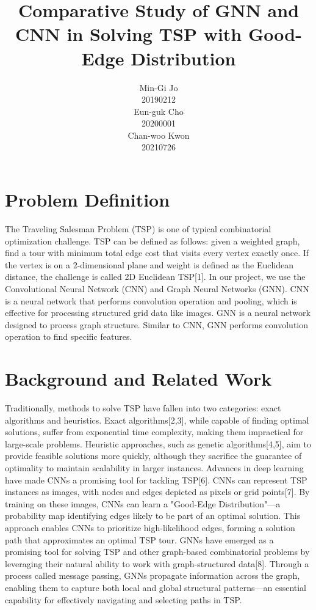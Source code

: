 \documentclass{article}
\title{Comparative Study of GNN and CNN in Solving TSP with Good-Edge Distribution}
\author{%
Min-Gi Jo \\
20190212\\
\And
Eun-guk Cho\\
20200001\\
\And
Chan-woo Kwon \\
20210726\\
}
\begin{document}
\maketitle

\section{Problem Definition}
The Traveling Salesman Problem (TSP) is one of typical combinatorial optimization challenge. TSP can be defined as follows: given a weighted graph, find a tour with minimum total edge cost that visits every vertex exactly once. If the vertex is on a 2-dimensional plane and weight is defined as the Euclidean distance, the challenge is called 2D Euclidean TSP[1].
In our project, we use the Convolutional Neural Network (CNN) and Graph Neural Networks (GNN). CNN is a neural network that performs convolution operation and pooling, which is effective for processing structured grid data like images. GNN is a neural network designed to process graph structure. Similar to CNN, GNN performs convolution operation to find specific features.


\section{Background and Related Work}
Traditionally, methods to solve TSP have fallen into two categories: exact algorithms and heuristics. Exact algorithms[2,3], while capable of finding optimal solutions, suffer from exponential time complexity, making them impractical for large-scale problems. Heuristic approaches, such as genetic algorithms[4,5], aim to provide feasible solutions more quickly, although they sacrifice the guarantee of optimality to maintain scalability in larger instances.
Advances in deep learning have made CNNs a promising tool for tackling TSP[6]. CNNs can represent TSP instances as images, with nodes and edges depicted as pixels or grid points[7]. By training on these images, CNNs can learn a "Good-Edge Distribution"—a probability map identifying edges likely to be part of an optimal solution. This approach enables CNNs to prioritize high-likelihood edges, forming a solution path that approximates an optimal TSP tour. GNNs have emerged as a promising tool for solving TSP and other graph-based combinatorial problems by leveraging their natural ability to work with graph-structured data[8]. Through a process called message passing, GNNs propagate information across the graph, enabling them to capture both local and global structural patterns—an essential capability for effectively navigating and selecting paths in TSP.
\end{document}
